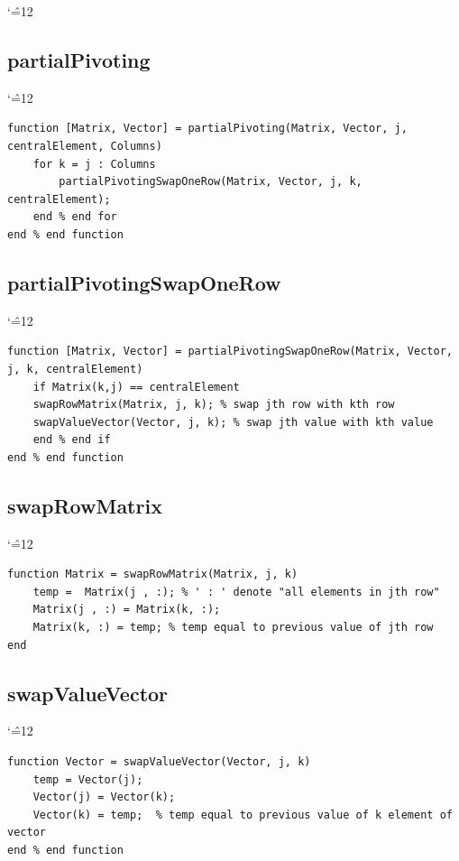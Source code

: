 \documentclass[12pt]{report}
\newenvironment{simplechar}{%
   \catcode`\^=12
}{}
\begin{document}
\begin{simplechar}
\subsection{partialPivoting}
\begin{simplechar}
\begin{lstlisting}
function [Matrix, Vector] = partialPivoting(Matrix, Vector, j, centralElement, Columns)
    for k = j : Columns
        partialPivotingSwapOneRow(Matrix, Vector, j, k, centralElement);
    end % end for
end % end function
\end{lstlisting}
\end{simplechar}

\newpage
\subsection{partialPivotingSwapOneRow}
\begin{simplechar}
\begin{lstlisting}
function [Matrix, Vector] = partialPivotingSwapOneRow(Matrix, Vector, j, k, centralElement)
    if Matrix(k,j) == centralElement
    swapRowMatrix(Matrix, j, k); % swap jth row with kth row
    swapValueVector(Vector, j, k); % swap jth value with kth value
    end % end if
end % end function
\end{lstlisting}
\end{simplechar}


\subsection{swapRowMatrix}
\begin{simplechar}
\begin{lstlisting}
function Matrix = swapRowMatrix(Matrix, j, k)
    temp =  Matrix(j , :); % ' : ' denote "all elements in jth row"
    Matrix(j , :) = Matrix(k, :);
    Matrix(k, :) = temp; % temp equal to previous value of jth row
end
\end{lstlisting}
\end{simplechar}

\subsection{swapValueVector}
\begin{simplechar}
\begin{lstlisting}
function Vector = swapValueVector(Vector, j, k)
    temp = Vector(j);
    Vector(j) = Vector(k);
    Vector(k) = temp;  % temp equal to previous value of k element of vector
end % end function
\end{lstlisting}
\end{simplechar}


\end{simplechar}
\end{document}
